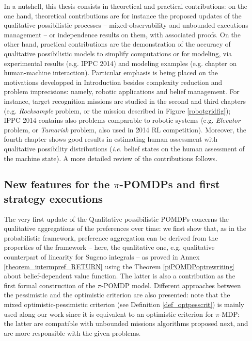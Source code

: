 In a nutshell, 
this thesis consists in
theoretical and practical contributions:
on the one hand, theoretical contributions 
are for instance 
the proposed updates of the qualitative possibilistic processes
-- mixed-observability and unbounded executions management -- 
or independence results on them, with associated proofs.
On the other hand, 
practical contributions
are the demonstration of the accuracy 
of qualitative possibilistic models
to simplify computations or for modeling,
via experimental results (e.g. IPPC 2014) 
and modeling examples (e.g. chapter on human-machine interaction).
Particular emphasis is being placed 
on the motivations developped in Introduction
besides complexity reduction and problem imprecisions:
namely, robotic applications and belief management.
For instance, target recognition missions 
are studied in the second and third chapters 
(e.g. \textit{Rocksample} problem, or the mission described in Figure \ref{robotgridfig});
IPPC 2014 contains also problems comparable to robotic systems 
(e.g. \textit{Elevator} problem, or \textit{Tamarisk} problem, also used in 2014 RL competition). 
Moreover, the fourth chapter shows good results 
in estimating human assessment with qualitative possibility distributions
(\textit{i.e.} belief states on the human assessment of the machine state).
A more detailed review of the contributions follows.

\subsection*{New features for the $\pi$-POMDPs
and first strategy executions}
The very first update 
of the Qualitative possibilistic POMDPs \cite{Sabbadin:1999:pipomdp} 
concerns the qualitative aggregations 
of the preferences over time:
we first show that, 
as in the probabilistic framework,
preference aggregation can be derived 
from the properties of the framework 
-- here, the qualitative one, 
e.g. qualitative counterpart of linearity for Sugeno integrals --
as proved in Annex \ref{theorem_intermpref_RETURN} 
using the Theorem \ref{piPOMDPoptrewriting} 
about belief-dependent value function.
The latter is also a contribution 
as the first formal construction
of the $\pi$-POMDP model.
Different approaches between the pessimistic and the optimistic criterion
are also presented: 
note that the mixed optimistic-pessimistic criterion 
(see Definition \ref{def_optpesscrit}) 
is mainly used along our work 
since it is equivalent to 
an optimistic criterion for $\pi$-MDP:
the latter are compatible 
with unbounded missions algorithms proposed next,
and are more responsible with the given problems.

